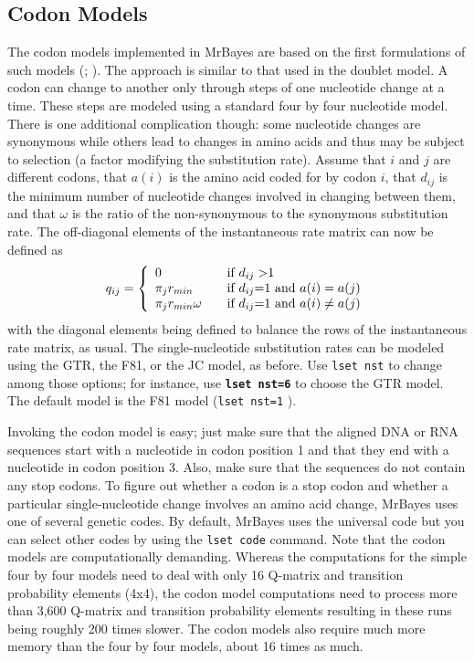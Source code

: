 \documentclass[12pt]{book}
\newcommand{\ttt}[1]{\texttt{#1} }
\newcommand{\tb}[1]{\ttt{\textbf{#1}} }
\begin{document}
\subsection{Codon Models}
The codon models implemented in MrBayes are based on the first formulations of such models
(\citet{goldman94}; \citet{muse94}). The approach is similar to that used in the doublet model. A
codon can change to another only through steps of one nucleotide change at a time. These steps are
modeled using a standard four by four nucleotide model. There is one additional complication
though: some nucleotide changes are synonymous while others lead to changes in amino acids and thus
may be subject to selection (a factor modifying the substitution rate). Assume that $i$ and $j$ are
different codons, that $a(i)$ is the amino acid coded for by codon $i$, that $d_{ij}$ is the
minimum number of nucleotide changes involved in changing between them, and that $\omega$ is the
ratio of the non-synonymous to the synonymous substitution rate. The off-diagonal elements of the
instantaneous rate matrix can now be defined as
\[
q_{ij} = \left\{ 
\begin{array}{l l}
  0 & \quad \text{if $d_{ij}>$1 } \\
 \pi_j r_{min} & \quad \text{if $d_{ij}$=1 and $a(i)=a(j)$}\\
 \pi_j r_{min} \omega & \quad \text{if $d_{ij}$=1 and $a(i)\neq a(j)$}\\
\end{array} \right.
\]
with the diagonal elements being defined to balance the rows of the instantaneous rate matrix, as
usual. The single-nucleotide substitution rates can be modeled using the GTR, the F81, or the JC
model, as before. Use \ttt{lset nst} to change among those options; for instance, use \tb{lset
nst=6} to choose the GTR model. The default model is the F81 model (\ttt{lset nst=1}).

Invoking the codon model is easy; just make sure that the aligned DNA or RNA sequences start with a
nucleotide in codon position 1 and that they end with a nucleotide in codon position 3. Also, make
sure that the sequences do not contain any stop codons.  To figure out whether a codon is a stop
codon and whether a particular single-nucleotide change involves an amino acid change, MrBayes uses
one of several genetic codes. By default, MrBayes uses the universal code but you can select other
codes by using the \ttt{lset code} command. Note that the codon models are computationally
demanding.  Whereas the computations for the simple four by four models need to deal with only 16
Q-matrix and transition probability elements (4x4), the codon model computations need to process
more than 3,600 Q-matrix and transition probability elements resulting in these runs being roughly
200 times slower. The codon models also require much more memory than the four by four models,
about 16 times as much.
\end{document}
